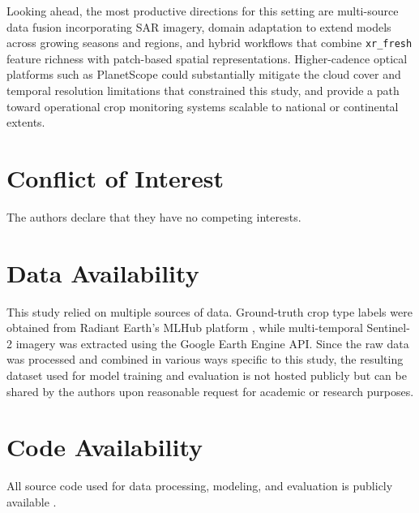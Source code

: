 \documentclass[pdflatex,sn-mathphys]{sn-jnl} %
\begin{document}
Looking ahead, the most productive directions for this setting are multi-source data fusion incorporating SAR imagery, domain adaptation to extend models across growing seasons and regions, and hybrid workflows that combine \texttt{xr\_fresh} feature richness with patch-based spatial representations. Higher-cadence optical platforms such as PlanetScope could substantially mitigate the cloud cover and temporal resolution limitations that constrained this study, and provide a path toward operational crop monitoring systems scalable to national or continental extents.

\section*{Conflict of Interest}

The authors declare that they have no competing interests.

\section*{Data Availability}

This study relied on multiple sources of data. Ground-truth crop type labels were obtained from Radiant Earth’s MLHub platform \cite{mlhub}, while multi-temporal Sentinel-2 imagery was extracted using the Google Earth Engine API. Since the raw data was processed and combined in various ways specific to this study, the resulting dataset used for model training and evaluation is not hosted publicly but can be shared by the authors upon reasonable request for academic or research purposes.

\section*{Code Availability}

All source code used for data processing, modeling, and evaluation is publicly available \cite{capstone_repo}.
\end{document}
